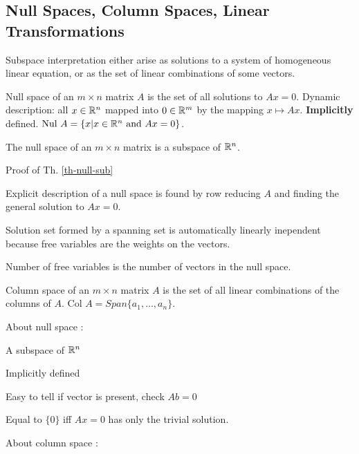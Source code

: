 \begin{card}
    \subsection{Null Spaces, Column Spaces, Linear Transformations}

    \begin{compactdesc}
    \item[Subspace interpretation] either arise as solutions to a system
        of homogeneous linear equation, or as the set of linear combinations
        of some vectors.
    \item[Null space] of an $m \times n$ matrix $A$ is the set of all
        solutions to $Ax = 0$. Dynamic description: all $x \in \mathbb{R}^n$ mapped
        into $0 \in \mathbb{R}^m$ by the mapping $x \mapsto Ax$.
        \textbf{Implicitly} defined.
        $\text{Nul } A = \{x | x \in \mathbb{R}^n \text{ and } Ax = 0 \}$.
    \end{compactdesc}
    \begin{theorem}%
        [Null space is subspace]\label{th-null-sub}
    The null space of an $m \times n$ matrix is a subspace of $\mathbb{R}^n$.
    \end{theorem}
    \begin{compactdesc}
    \item[Proof of Th. \ref{th-null-sub}]
    \item[Explicit description] of a null space is found by row reducing $A$
        and finding the general solution to $Ax = 0$.
    \item[Solution set] formed by a spanning set is automatically
        linearly inependent because free variables are the weights on the
        vectors.
    \item[Number of free variables] is the number of vectors in the
        null space.
    \item[Column space] of an $m \times n$ matrix $A$ is the set of all
        linear combinations of the columns of $A$.
        $\text{Col } A = Span \{a_1, \dotsc, a_n\}$.
    \item[About null space]:

        \begin{compactenum}
        \item A subspace of $\mathbb{R}^n$
        \item Implicitly defined
        \item Easy to tell if vector is present, check $Ab = 0$
        \item Equal to $\{0\}$ iff $Ax = 0$ has only the trivial solution.
        \end{compactenum}
    \item[About column space]:


\end{compactdesc}
\end{card}

